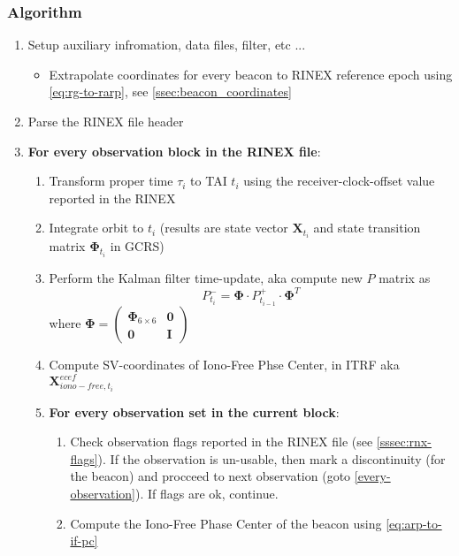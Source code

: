 \subsubsection{Algorithm}
\begin{enumerate}
  \item Setup auxiliary infromation, data files, filter, etc ...
  \begin{itemize}
    \item Extrapolate coordinates for every beacon to RINEX reference epoch using \ref{eq:rg-to-rarp}, see \ref{ssec:beacon_coordinates}
  \end{itemize}

  \item Parse the RINEX file header

  \item \textbf{For every observation block in the RINEX file}:
    \begin{enumerate}\label{every-block}
      \item Transform proper time $\tau _i$ to TAI $t_i$ using the receiver-clock-offset 
        value reported in the RINEX
      \item Integrate orbit to $t_i$ (results are state vector $\bm{X}_{t_i}$ and state 
        transition matrix $\bm{\Phi}_{t_i}$ in GCRS)
      \item Perform the Kalman filter time-update, aka compute new $P$ matrix as 
        \begin{equation}
          P^- _{t_i} = \bm{\Phi} \cdot P^+ _{t_{i-1}} \cdot \bm{\Phi}^T
        \end{equation}
        where $\bm{\Phi} = \begin{pmatrix} \bm{\Phi}_{6\times 6} & \bm{0} \\ \bm{0} & \bm{I} \end{pmatrix}$
        \item Compute SV-coordinates of Iono-Free Phse Center, in ITRF aka $\bm{X}^{ecef}_{iono-free,t_i}$
        \item \textbf{For every observation set in the current block}:
          \begin{enumerate}\label{every-observation}
            \item Check observation flags reported in the RINEX file (see \ref{sssec:rnx-flags}). 
              If the observation is un-usable, then mark a discontinuity (for the beacon) and procceed 
              to next observation (goto \ref{every-observation}). If flags are ok, continue.
            \item Compute the Iono-Free Phase Center of the beacon using \ref{eq:arp-to-if-pc} 

\end{enumerate}
\end{enumerate}
\end{enumerate}
